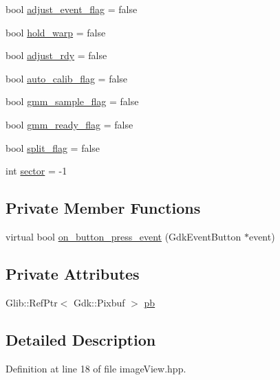 \begin{DoxyCompactItemize}
\item 
bool \hyperlink{class_image_view_abc6c43376871979a67c86b041025ab07}{adjust\+\_\+event\+\_\+flag} = false
\item 
bool \hyperlink{class_image_view_a93112870dda714b0bbe59b8f6cfe4b99}{hold\+\_\+warp} = false
\item 
bool \hyperlink{class_image_view_a9a73e324dd284f7b6b33b760b9a21c33}{adjust\+\_\+rdy} = false
\item 
bool \hyperlink{class_image_view_af9ca8bbc458a3cbd3838113637606806}{auto\+\_\+calib\+\_\+flag} = false
\item 
bool \hyperlink{class_image_view_a8256ad985182f4fdb62f15d48c9ddc9f}{gmm\+\_\+sample\+\_\+flag} = false
\item 
bool \hyperlink{class_image_view_abf9a90b70c0fb02bf94a35e4a98ae50b}{gmm\+\_\+ready\+\_\+flag} = false
\item 
bool \hyperlink{class_image_view_af347599c5ea679b8ed0ca867f3a942c5}{split\+\_\+flag} = false
\item 
int \hyperlink{class_image_view_a0a5a7071e17e23864058b755b515e9ab}{sector} = -\/1
\end{DoxyCompactItemize}
\subsection*{Private Member Functions}
\begin{DoxyCompactItemize}
\item 
virtual bool \hyperlink{class_image_view_ab7d917a1282ba8cdd902d49a4cd0d0cc}{on\+\_\+button\+\_\+press\+\_\+event} (Gdk\+Event\+Button $\ast$event)
\end{DoxyCompactItemize}
\subsection*{Private Attributes}
\begin{DoxyCompactItemize}
\item 
Glib\+::\+Ref\+Ptr$<$ Gdk\+::\+Pixbuf $>$ \hyperlink{class_image_view_aad080a9649488e9141f2ce0256dd4035}{pb}
\end{DoxyCompactItemize}


\subsection{Detailed Description}


Definition at line 18 of file image\+View.\+hpp.



